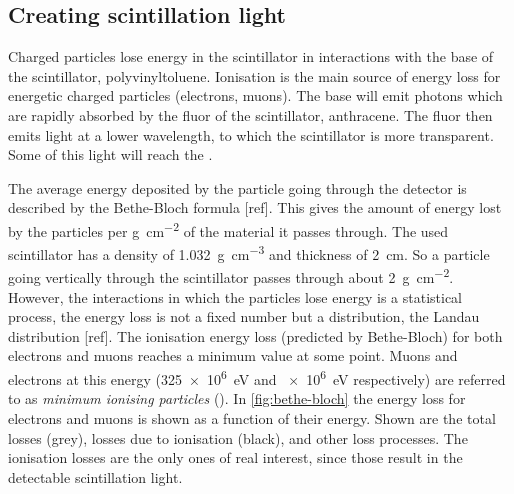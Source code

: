 \subsection{Creating scintillation light}

Charged particles lose energy in the scintillator in interactions with the base of the scintillator, polyvinyltoluene. Ionisation is the main source of energy loss for energetic charged particles (electrons, muons). The base will emit photons which are rapidly absorbed by the fluor of the scintillator, anthracene. The fluor then emits light at a lower wavelength, to which the scintillator is more transparent. Some of this light will reach the \pmt.

The average energy deposited by the particle going through the detector is described by the Bethe-Bloch formula [ref]. This gives the amount of energy lost by the particles per \si{\gram\per\centi\meter\squared} of the material it passes through. The used scintillator has a density of \SI{1.032}{\gram\per\centi\meter\cubed} and thickness of \SI{2}{\centi\meter}. So a particle going vertically through the scintillator passes through about \SI{2}{\gram\per\centi\meter\squared}. However, the interactions in which the particles lose energy is a statistical process, the energy loss is not a fixed number but a distribution, the Landau distribution [ref]. The ionisation energy loss (predicted by Bethe-Bloch) for both electrons and muons reaches a minimum value at some point. Muons and electrons at this energy (\SI{325e6}{\eV} and \SI{e6}{\eV} respectively) are referred to as \textit{minimum ionising particles} (\mip). In \cref{fig:bethe-bloch} the energy loss for electrons and muons is shown as a function of their energy. Shown are the total losses (grey), losses due to ionisation (black), and other loss processes. The ionisation losses are the only ones of real interest, since those result in the detectable scintillation light.


